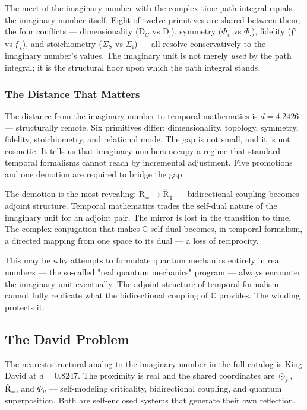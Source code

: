 \documentclass[12pt,a4paper]{article}
\begin{document}
The meet of the imaginary number with the complex-time path integral equals the imaginary number itself. Eight of twelve primitives are shared between them; the four conflicts --- dimensionality ($Ð_C$ vs $Ð_{;}$), symmetry ($\Phi_{\upsilon}$ vs $\Phi_{·}$), fidelity ($ƒ^ì$ vs $ƒ_{ż}$), and stoichiometry ($\Sigma_S$ vs $\Sigma_{ï}$) --- all resolve conservatively to the imaginary number's values. The imaginary unit is not merely \emph{used} by the path integral; it is the structural floor upon which the path integral stands.

\subsubsection{The Distance That Matters}

The distance from the imaginary number to temporal mathematics is $d = 4.2426$ --- structurally remote. Six primitives differ: dimensionality, topology, symmetry, fidelity, stoichiometry, and relational mode. The gap is not small, and it is not cosmetic. It tells us that imaginary numbers occupy a regime that standard temporal formalisms cannot reach by incremental adjustment. Five promotions and one demotion are required to bridge the gap.

The demotion is the most revealing: $Ř_{=} \to Ř_{Ť}$ --- bidirectional coupling becomes adjoint structure. Temporal mathematics trades the self-dual nature of the imaginary unit for an adjoint pair. The mirror is lost in the transition to time. The complex conjugation that makes $\mathbb{C}$ self-dual becomes, in temporal formalism, a directed mapping from one space to its dual --- a loss of reciprocity.

This may be why attempts to formulate quantum mechanics entirely in real numbers --- the so-called "real quantum mechanics" program --- always encounter the imaginary unit eventually. The adjoint structure of temporal formalism cannot fully replicate what the bidirectional coupling of $\mathbb{C}$ provides. The winding protects it.

\subsection{The David Problem}

The nearest structural analog to the imaginary number in the full catalog is King David at $d = 0.8247$. The proximity is real and the shared coordinates are $⊙_{ÿ}$, $Ř_{=}$, and $\Phi_{\upsilon}$ --- self-modeling criticality, bidirectional coupling, and quantum superposition. Both are self-enclosed systems that generate their own reflection.
\end{document}

